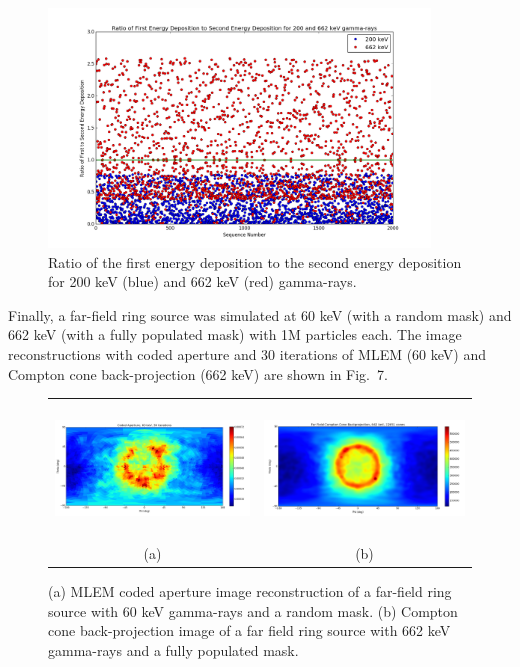 \documentclass[10pt]{article}
\begin{document}
\begin{figure}[htb!]
\hypertarget{fig6}{}
\centering
\includegraphics[height=180pt]{Figures/EnergyDepTest.png} 
\caption{Ratio of the first energy deposition to the second energy deposition for 200 keV (blue) and 662 keV (red) gamma-rays.}
\end{figure}

Finally, a far-field ring source was simulated at 60 keV (with a random mask) and 662 keV (with a fully populated mask) with 1M particles each. The image reconstructions with coded aperture and 30 iterations of MLEM (60 keV) and Compton cone back-projection (662 keV) are shown in Fig.~7. 

\begin{figure}[htb!]
\hypertarget{fig7}{}
\centering
\begin{tabular}{cc}
	\includegraphics[height=100pt]{Figures/FarfieldRing_60.png} & 
	\includegraphics[height=100pt]{Figures/FarfieldRing_662.png} \\ [-0.5ex]
	\scriptsize{(a)} & \scriptsize{(b)}
\end{tabular}
\caption{(a) MLEM coded aperture image reconstruction of a far-field ring source with 60 keV gamma-rays and a random mask. (b) Compton cone back-projection image of a far field ring source with 662 keV gamma-rays and a fully populated mask.}
\end{figure}
\end{document}

